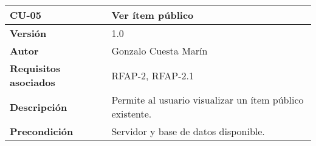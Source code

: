 \begin{longtable}[]{@{}ll@{}}
\toprule
\begin{minipage}[b]{0.20\columnwidth}\raggedright
\textbf{CU-05}\strut
\end{minipage} & \begin{minipage}[b]{0.74\columnwidth}\raggedright
\textbf{Ver ítem público}\strut
\end{minipage}\tabularnewline
\midrule
\endhead
\begin{minipage}[t]{0.20\columnwidth}\raggedright
\textbf{Versión}\strut
\end{minipage} & \begin{minipage}[t]{0.74\columnwidth}\raggedright
1.0\strut
\end{minipage}\tabularnewline
\begin{minipage}[t]{0.20\columnwidth}\raggedright
\textbf{Autor}\strut
\end{minipage} & \begin{minipage}[t]{0.74\columnwidth}\raggedright
Gonzalo Cuesta Marín\strut
\end{minipage}\tabularnewline
\begin{minipage}[t]{0.20\columnwidth}\raggedright
\textbf{Requisitos asociados}\strut
\end{minipage} & \begin{minipage}[t]{0.74\columnwidth}\raggedright
RFAP-2, RFAP-2.1\strut
\end{minipage}\tabularnewline
\begin{minipage}[t]{0.20\columnwidth}\raggedright
\textbf{Descripción}\strut
\end{minipage} & \begin{minipage}[t]{0.74\columnwidth}\raggedright
Permite al usuario visualizar un ítem público existente.\strut
\end{minipage}\tabularnewline
\begin{minipage}[t]{0.20\columnwidth}\raggedright
\textbf{Precondición}\strut
\end{minipage} & \begin{minipage}[t]{0.74\columnwidth}\raggedright
Servidor y base de datos disponible.


\end{minipage}
\end{longtable}
